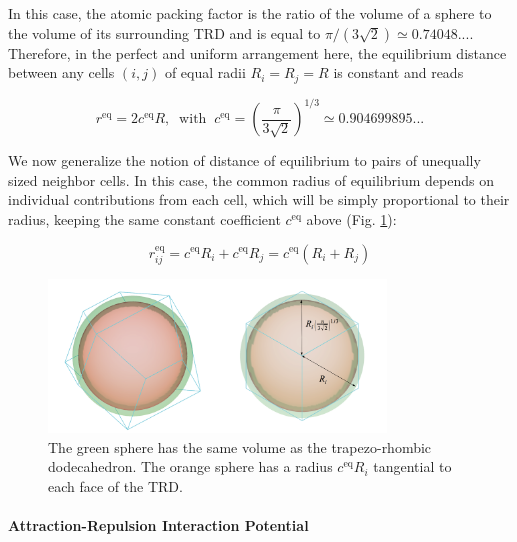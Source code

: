 In this case, the atomic packing factor is the ratio of the volume of a sphere to the volume of its surrounding TRD and is equal to $\pi/(3\sqrt{2}) \simeq 0.74048... $. Therefore, in the perfect and uniform arrangement here, the equilibrium distance between any cells $(i,j)$ of equal radii $R_i = R_j = R$ is constant and reads

$$r^{\mathrm{eq}} = 2c^{\mathrm{eq}} R, \;\;  \mathrm{with} \;\; c^{\mathrm{eq}} = \left({\frac{\pi}{3\sqrt{2}}}\right)^{1/3} \simeq 0.904699895...$$

We now generalize the notion of distance of equilibrium to pairs of unequally sized neighbor cells. In this case, the common radius of equilibrium depends on individual contributions from each cell, which will be simply proportional to their radius, keeping the same constant coefficient $c^{\mathrm{eq}}$ above (Fig. \ref{potential_apf_sphere_figure}):

$$r^{\mathrm{eq}}_{ij} = c^{\mathrm{eq}}R_i + c^{\mathrm{eq}}R_j = c^{\mathrm{eq}}(R_i + R_j)$$
\begin{figure}
\begin{center}
\includegraphics[width=0.8\textwidth]{../../images/MECAGEN/potential/apf_sphere_figure.png}
\end{center}
\caption{The green sphere has the same volume as the trapezo-rhombic dodecahedron. The orange sphere has a radius $c^{\mathrm{eq}}R_i$ tangential to each face of the TRD.}
\label{potential_apf_sphere_figure}
\end{figure}

\paragraph{Attraction-Repulsion Interaction Potential}


